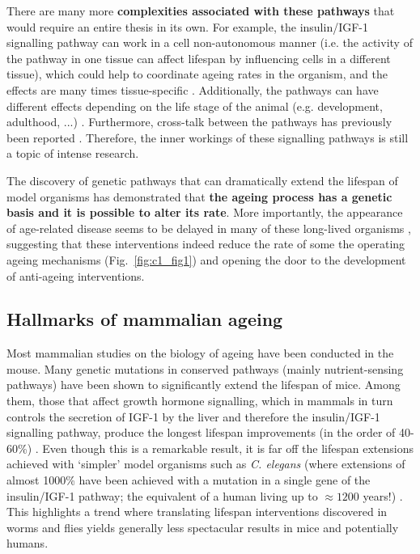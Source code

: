 \bigskip

There are many more \textbf{complexities associated with these pathways} that would require an entire thesis in its own. For example, the insulin/IGF-1 signalling pathway can work in a cell non-autonomous manner (i.e. the activity of the pathway in one tissue can affect lifespan by influencing cells in a different tissue), which could help to coordinate ageing rates in the organism, and the effects are many times tissue-specific \cite{Kenyon2005,Kenyon2010}. Additionally, the pathways can have different effects depending on the life stage of the animal (e.g. development, adulthood, ...) \cite{Dillin2002}. Furthermore, cross-talk between the pathways has previously been reported \cite{Bonkowski2016, Greer2007}. Therefore, the inner workings of these signalling pathways is still a topic of intense research.

\bigskip

The discovery of genetic pathways that can dramatically extend the lifespan of model organisms has demonstrated that \textbf{the ageing process has a genetic basis and it is possible to alter its rate}. More importantly, the appearance of age-related disease seems to be delayed in many of these long-lived organisms \cite{Kenyon2010,Arantes-Oliveira2003}, suggesting that these interventions indeed reduce the rate of some the operating ageing mechanisms (Fig.~\ref{fig:c1_fig1}) and opening the door to the development of anti-ageing interventions. 

\smallskip

\subsection{Hallmarks of mammalian ageing} \label{s:1.1.3}

\smallskip

Most mammalian studies on the biology of ageing have been conducted in the mouse. Many genetic mutations in conserved pathways (mainly nutrient-sensing pathways) have been shown to significantly extend the lifespan of mice. Among them, those that affect growth hormone signalling, which in mammals in turn controls the secretion of IGF-1 by the liver and therefore the insulin/IGF-1 signalling pathway, produce the longest lifespan improvements (in the order of 40-60\%) \cite{Singh2019}. Even though this is a remarkable result, it is far off the lifespan extensions achieved with `simpler' model organisms such as \textit{C. elegans} (where extensions of almost 1000\% have been achieved with a mutation in a single gene of the insulin/IGF-1 pathway; the equivalent of a human living up to $\approx 1200$ years!) \cite{Ayyadevara2008}. This highlights a trend where translating lifespan interventions discovered in worms and flies yields generally less spectacular results in mice and potentially humans.

